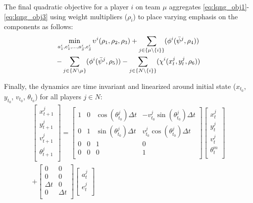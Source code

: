 The final quadratic objective for a player  $i$ on team $\mu$ aggregates \eqref{eq:lqng_obj1}-\eqref{eq:lqng_obj3} using weight multipliers ($\rho_i$) to place varying emphasis on the components as follows:
\begin{multline} \label{eq:lqng_obj}
    \min_{a^i_{1}, e^i_{1}, ..., a^i_{\Bar{\delta}}, e^i_{\Bar{\delta}}}
    \upsilon^i(\rho_1, \rho_2,\rho_3)
    + \sum_{j \in \{\mu \setminus \{i\}\}}  (\phi^i(\Bar{\psi}^j, \rho_4)) \\
     -\sum_{j \in \{N \setminus \mu\}}  (\phi^i(\Bar{\psi}^j, \rho_5))
    - \sum_{j \in \{N \setminus \{i\}\}} (\chi^i(x^j_t, y^j_t, \rho_6))
\end{multline}

Finally, the dynamics are time invariant and linearized around initial state ($x_{t_0}$, $y_{t_0}$, $v_{t_0}$, $\theta_{t_0}$) for all players $j \in N$:
\begin{multline} \label{eq:lqng_dyn}
\begin{bmatrix}
x^j_{t+1} \\
y^j_{t+1} \\
v^j_{t+1} \\
\theta^j_{t+1} \\
\end{bmatrix} = 
\begin{bmatrix} 
	1 & 0 & \cos(\theta^j_{t_0})\Delta t & -v^j_{t_0}\sin(\theta^j_{t_0})\Delta t\\
	0 & 1 & \sin(\theta^j_{t_0})\Delta t & v^j_{t_0}\cos(\theta^j_{t_0})\Delta t\\
	0 & 0 & 1 & 0\\
	0 & 0 & 0 & 1\\
	\end{bmatrix}
\begin{bmatrix}
x^j_{t} \\
y^j_{t} \\
v^j_{t} \\
\theta^m_{t} \\
\end{bmatrix} \\ +
\begin{bmatrix} 
	0 & 0 \\
	0 & 0 \\
	\Delta t & 0 \\
	0 & \Delta t \\
	\end{bmatrix}
	\begin{bmatrix} 
	a^j_t  \\
	e^j_t \\
	\end{bmatrix}
\end{multline}

